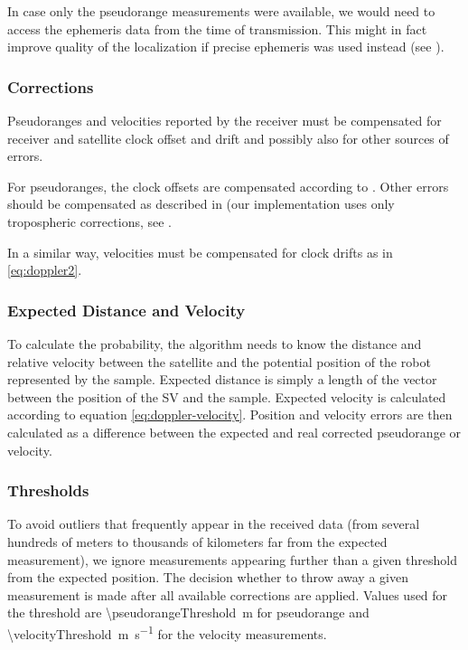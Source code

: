 In case only the pseudorange measurements were available, we would need to access the
ephemeris data from the time of transmission.
This might in fact improve quality of the localization if precise ephemeris
was used instead (see ).

\subsubsection{Corrections}
Pseudoranges and velocities reported by the receiver must be compensated
for receiver and satellite clock offset and drift and possibly also for other
sources of errors.

For pseudoranges, the clock offsets are compensated according to .
Other errors should be compensated as described in 
(our implementation uses only tropospheric corrections, see .

In a similar way, velocities must be compensated for clock drifts 
as in \eqref{eq:doppler2}.

\subsubsection{Expected Distance and Velocity}
To calculate the probability, the algorithm needs to know the distance and relative
velocity between the satellite and the potential position of the robot represented
by the sample.
Expected distance is simply a length of the vector between the position of the SV
and the sample.
Expected velocity is calculated according to equation \eqref{eq:doppler-velocity}.
Position and velocity errors are then calculated as a difference between the expected
and real corrected pseudorange or velocity.

\subsubsection{Thresholds}
\label{sec:gps-thresholds}
To avoid outliers that frequently appear in the received data (from several hundreds
of meters to thousands of kilometers far from the expected measurement), we
ignore measurements appearing further than a given threshold from the expected position.
The decision whether to throw away a given measurement is made after all available corrections
are applied.
Values used for the threshold are \SI{\pseudorangeThreshold}{\meter} for pseudorange
and \SI{\velocityThreshold}{\meter\per\second} for the velocity measurements.

